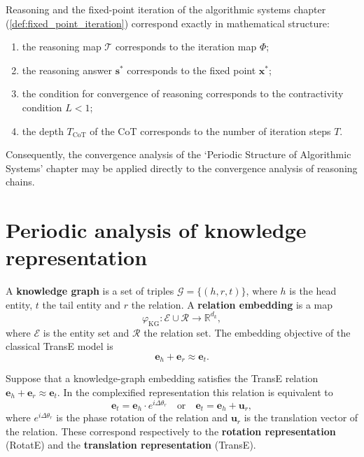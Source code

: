 \begin{remark}\label{rem:reasoning_fixed_point_correspondence}
Reasoning and the fixed-point iteration of the algorithmic systems chapter (\cref{def:fixed_point_iteration}) correspond exactly in mathematical structure:
\begin{enumerate}[label=(\roman*)]
    \item the reasoning map $\mathcal{T}$ corresponds to the iteration map $\Phi$;
    \item the reasoning answer $\mathbf{s}^*$ corresponds to the fixed point $\mathbf{x}^*$;
    \item the condition for convergence of reasoning corresponds to the contractivity condition $L<1$;
    \item the depth $T_{\text{CoT}}$ of the CoT corresponds to the number of iteration steps $T$.
\end{enumerate}
Consequently, the convergence analysis of the `Periodic Structure of Algorithmic Systems' chapter may be applied directly to the convergence analysis of reasoning chains.
\end{remark}

\section{Periodic analysis of knowledge representation}
\label{sec:knowledge_periodicity}

\begin{definition}\label{def:knowledge_graph_embedding}
A \textbf{knowledge graph} is a set of triples $\mathcal{G}=\{(h,r,t)\}$, where $h$ is the head entity, $t$ the tail entity and $r$ the relation. A \textbf{relation embedding} is a map
\[
\varphi_{\text{KG}}:\mathcal{E}\cup\mathcal{R}\to\mathbb{R}^{d_k},
\]
where $\mathcal{E}$ is the entity set and $\mathcal{R}$ the relation set. The embedding objective of the classical TransE model is
\[
\mathbf{e}_h+\mathbf{e}_r\approx\mathbf{e}_t.
\]
\end{definition}

\begin{theorem}\label{thm:relation_translation_rotation}
Suppose that a knowledge-graph embedding satisfies the TransE relation $\mathbf{e}_h+\mathbf{e}_r\approx\mathbf{e}_t$. In the complexified representation this relation is equivalent to
\[
\mathbf{e}_t=\mathbf{e}_h\cdot e^{i\Delta\theta_r}\quad\text{or}\quad
\mathbf{e}_t=\mathbf{e}_h+\mathbf{u}_r,
\]
where $e^{i\Delta\theta_r}$ is the phase rotation of the relation and $\mathbf{u}_r$ is the translation vector of the relation. These correspond respectively to the \textbf{rotation representation} (RotatE) and the \textbf{translation representation} (TransE).
\end{theorem}


